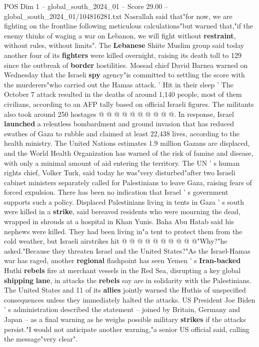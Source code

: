 \begin{textsample}{POS Dim 1 – global\_south\_2024\_01 – Score 29.00 – global\_south\_2024\_01/104816281.txt}
Nasrallah said that"for now, we are fighting on the frontline following meticulous calculations"but warned that,"if the enemy thinks of waging a war on Lebanon, we will fight without \textbf{restraint}, without rules, without limits".
The \textbf{Lebanese} Shiite Muslim group said today another four of its \textbf{fighters} were killed overnight, raising its death toll to 129 since the outbreak of \textbf{border} hostilities.
Mossad chief David Barnea warned on Wednesday that the Israeli \textbf{spy} agency"is committed to settling the score with the murderers"who carried out the Hamas attack. ' Hit in their sleep ' The October 7 attack resulted in the deaths of around 1,140 people, most of them civilians, according to an AFP tally based on official Israeli figures.
The militants also took around 250 hostages @ @ @ @ @ @ @ @ @ @.
In response, Israel \textbf{launched} a relentless bombardment and ground invasion that has reduced swathes of Gaza to rubble and claimed at least 22,438 lives, according to the health ministry.
The United Nations estimates 1.9 million Gazans are displaced, and the World Health Organization has warned of the risk of famine and disease, with only a minimal amount of aid entering the territory.
The UN ' s human rights chief, Volker Turk, said today he was"very disturbed"after two Israeli cabinet ministers separately called for Palestinians to leave Gaza, raising fears of forced expulsion.
There has been no indication that Israel ' s government supports such a policy.
Displaced Palestinians living in tents in Gaza ' s south were killed in a \textbf{strike}, said bereaved residents who were mourning the dead, wrapped in shrouds at a hospital in Khan Yunis.
Baha Abu Hatab said his nephews were killed.
They had been living in"a tent to protect them from the cold weather, but Israeli airstrikes hit @ @ @ @ @ @ @ @ @ @"Why?"he asked."Because they threaten Israel and the United States?"As the Israel-Hamas war has raged, another \textbf{regional} flashpoint has seen Yemen ' s \textbf{Iran-backed} Huthi \textbf{rebels} fire at merchant vessels in the Red Sea, disrupting a key global \textbf{shipping} \textbf{lane}, in attacks the \textbf{rebels} say are in solidarity with the Palestinians.
The United States and 11 of its \textbf{allies} jointly warned the Huthis of unspecified consequences unless they immediately halted the attacks.
US President Joe Biden ' s administration described the statement -- joined by Britain, Germany and Japan -- as a final warning as he weighs possible military \textbf{strikes} if the attacks persist."I would not anticipate another warning,"a senior US official said, calling the message"very clear".

\end{textsample}
